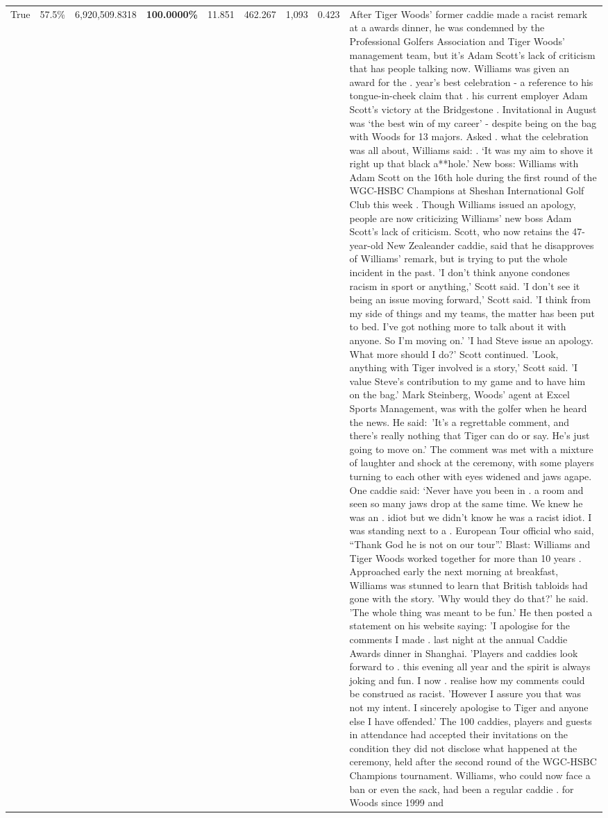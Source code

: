 \begin{table}[H]
\begin{tabular}{lllrlllll}
True & 57.5\% & 6,920,509.8318 & \bfseries \color{red} 100.0000\% & 11.851 & 462.267 & 1,093 & 0.423 & After Tiger Woods' former caddie made a racist remark at a awards dinner, he was condemned by the Professional Golfers Association and Tiger Woods' management team, but it's Adam Scott's lack of criticism that has people talking now. Williams was given an award for the . year’s best celebration - a reference to his tongue-in-cheek claim that . his current employer Adam Scott’s victory at the Bridgestone . Invitational in August was ‘the best win of my career’ - despite being on the bag with Woods for 13 majors. Asked . what the celebration was all about, Williams said: . ‘It was my aim to shove it right up that black a**hole.’ New boss: Williams with Adam Scott  on the 16th hole during the first round of the WGC-HSBC Champions at Sheshan International Golf Club this week . Though Williams issued an apology, people are now criticizing Williams' new boss Adam Scott's lack of criticism. Scott, who now retains the 47-year-old New Zealeander caddie, said that he disapproves of Williams' remark, but is trying to put the whole incident in the past. 'I don't think anyone condones racism in sport or anything,' Scott said. 'I don't see it being an issue moving forward,' Scott said. 'I think from my side of things and my teams, the matter has been put to bed. I've got nothing more to talk about it with anyone. So I'm moving on.' 'I had Steve issue an apology. What more should I do?' Scott continued. 'Look, anything with Tiger involved is a story,' Scott said. 'I value Steve's contribution to my game and to have him on the bag.' Mark Steinberg, Woods' agent at Excel Sports Management, was with the golfer when he heard the news. He said: 'It's a regrettable comment, and there's really nothing that Tiger can do or say. He's just going to move on.' The comment was met with a mixture of laughter and shock at the ceremony, with some players turning to each other with eyes widened and jaws agape. One caddie said: ‘Never have you been in . a room and seen so many jaws drop at the same time. We knew he was an . idiot but we didn’t know he was a racist idiot. I was standing next to a . European Tour official who said, “Thank God he is not on our tour”.’ Blast: Williams and Tiger Woods worked together for more than 10 years . Approached early the next morning at breakfast, Williams was stunned to learn that British tabloids had gone with the story. 'Why would they do that?' he said. 'The whole thing was meant to be fun.' He then posted a statement on his website saying: 'I apologise for the comments I made . last night at the annual Caddie Awards dinner in Shanghai. 'Players and caddies look forward to . this evening all year and the spirit is always joking and fun. I now . realise how my comments could be construed as racist. 'However I assure you that was not my intent. I sincerely apologise to Tiger and anyone else I have offended.' The 100 caddies, players and guests in attendance had accepted their invitations on the condition they did not disclose what happened at the ceremony, held after the second round of the WGC-HSBC Champions tournament. Williams, who could now face a ban or even the sack, had been a regular caddie . for Woods since 1999 and 
\end{tabular}
\end{table}
